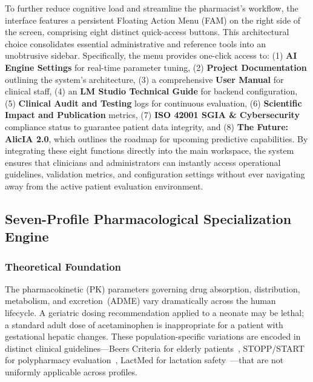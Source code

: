 \documentclass[9pt,conference]{IEEEtran}
\begin{document}
To further reduce cognitive load and streamline the pharmacist's workflow, the interface features a persistent Floating Action Menu (FAM) on the right side of the screen, comprising eight distinct quick-access buttons. This architectural choice consolidates essential administrative and reference tools into an unobtrusive sidebar. Specifically, the menu provides one-click access to: (1) \textbf{AI Engine Settings} for real-time parameter tuning, (2) \textbf{Project Documentation} outlining the system's architecture, (3) a comprehensive \textbf{User Manual} for clinical staff, (4) an \textbf{LM Studio Technical Guide} for backend configuration, (5) \textbf{Clinical Audit and Testing} logs for continuous evaluation, (6) \textbf{Scientific Impact and Publication} metrics, (7) \textbf{ISO 42001 SGIA \& Cybersecurity} compliance status to guarantee patient data integrity, and (8) \textbf{The Future: AlicIA 2.0}, which outlines the roadmap for upcoming predictive capabilities. By integrating these eight functions directly into the main workspace, the system ensures that clinicians and administrators can instantly access operational guidelines, validation metrics, and configuration settings without ever navigating away from the active patient evaluation environment.



\subsection{Seven-Profile Pharmacological Specialization Engine}
\label{subsec:profiles}

\subsubsection{Theoretical Foundation}

The pharmacokinetic (PK) parameters governing drug absorption, distribution,
metabolism, and excretion~(ADME) vary dramatically across the human lifecycle.
A geriatric dosing recommendation applied to a neonate may be lethal; a standard
adult dose of acetaminophen is inappropriate for a patient with gestational
hepatic changes. These population-specific variations are encoded in distinct
clinical guidelines---Beers Criteria for elderly patients~\cite{samuel20232023},
STOPP/START for polypharmacy evaluation~\cite{o2023stopp}, LactMed for lactation
safety~\cite{lactmed}---that are not uniformly applicable across profiles.
\end{document}
